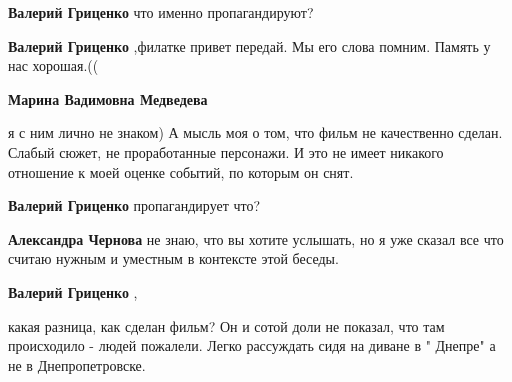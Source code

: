 \begin{itemize}
\begin{itemize}
\textbf{Валерий Гриценко} что именно пропагандируют?

 
\textbf{Валерий Гриценко} ,филатке привет передай. Мы его слова помним. Память у нас хорошая.((

 
\textbf{Марина Вадимовна Медведева} 

я с ним лично не знаком) А мысль моя о том, что фильм не качественно сделан.
Слабый сюжет, не проработанные персонажи. И это не имеет никакого отношение к
моей оценке событий, по которым он снят.


 
\textbf{Валерий Гриценко} пропагандирует что?

 
\textbf{Александра Чернова} не знаю, что вы хотите услышать, но я уже сказал все что считаю нужным и уместным в контексте этой беседы.

 
\textbf{Валерий Гриценко} ,

какая разница, как сделан фильм? Он и сотой доли не
показал, что там происходило - людей пожалели. Легко рассуждать сидя на диване в
" Днепре" а не в Днепропетровске.



\end{itemize}
\end{itemize}
